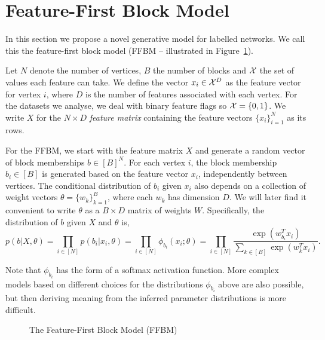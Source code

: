 \section{Feature-First Block Model}

In this section we propose a novel generative model for labelled networks. We call this the feature-first block model (FFBM -- illustrated in Figure~\ref{fig:ffbm}).

Let $N$ denote the number of vertices, $B$ the number of blocks
and ${\cal X}$ the set of values each feature can take.
We define the vector $x_i \in \mathcal{X}^D$ as the feature vector for vertex $i$, 
where $D$ is the number of features associated with each vertex.
For the datasets we analyse, we deal with binary feature flags so $\mathcal{X} = \{0, 1\}$. We write $X$ for the $N\times D$ {\em feature matrix} containing
the feature vectors $\{x_i\}_{i=1}^{N}$ 
as its rows.

For the FFBM, we start with the feature matrix $X$ and generate a random
vector of block memberships $b \in [B]^N$. For each vertex $i$, the
block membership $b_i\in[B]$ is generated based on the feature
vector $x_i$, independently between vertices. The conditional
distribution of $b_i$ given $x_i$ also depends on a collection
of weight vectors $\theta=\{w_k\}_{k=1}^B$, where each
$w_k$ has dimension $D$. We will later find it convenient
to write $\theta$ as a $B \times D$ matrix of weights $W$. Specifically, 
the distribution of $b$ given $X$ and $\theta$ is,
%
\begin{equation}
	p(b| X, \theta) = \prod_{i \in [N]} p(b_i | x_i, \theta) = \prod_{i \in [N]} \phi_{b_i} (x_i; \theta)
	= \prod_{i \in [N]} \frac{\exp\left(w_{b_i}^T x_i\right)}{\sum_{k \in [B]} \exp \left( w_k^T x_i\right)}.
\end{equation}

Note that $\phi_{b_i}$ has the form of a softmax activation function.
More complex models based on different choices for the distributions
$\phi_{b_i}$ above are also possible, but then deriving meaning from 
the inferred parameter distributions is more difficult. 
%
\begin{figure}
	\centering
	\caption{The Feature-First Block Model (FFBM)}
	\label{fig:ffbm}
\end{figure}

